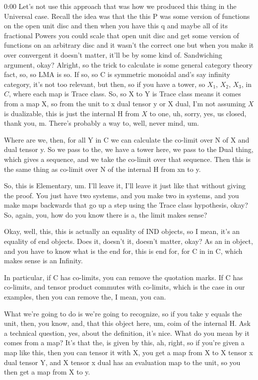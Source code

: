 \begin{unfinished}{0:00}
Let's not use this approach that was how we produced this thing in the Universal case. Recall the idea was that the this P was some version of functions on the open unit disc and then when you have this q and maybe all of its fractional Powers you could scale that open unit disc and get some version of functions on an arbitrary disc and it wasn't the correct one but when you make it over convergent it doesn't matter, it'll be by some kind of.
Sandwiching argument, okay? Alright, so the trick to calculate is some general category theory fact, so, so LMA is so. If so, so C is symmetric monoidal and's say infinity category, it's not too relevant, but then, so if you have a tower, so $X_1$, $X_2$, $X_3$, in $C$, where each map is Trace class. So, so X to Y is Trace class means it comes from a map X, so from the unit to x dual tensor y or X dual, I'm not assuming $X$ is dualizable, this is just the internal H from $X$ to one, uh, sorry, yes, us closed, thank you, m. There's probably a way to, well, never mind, um.

Where are we, then, for all Y in C we can calculate the co-limit over N of X and dual tensor y. So we pass to the, we have a tower here, we pass to the Dual thing, which gives a sequence, and we take the co-limit over that sequence. Then this is the same thing as co-limit over N of the internal H from xn to y.

So, this is Elementary, um. I'll leave it, I'll leave it just like that without giving the proof. You just have two systems, and you make two in systems, and you make maps backwards that go up a step using the Trace class hypothesis, okay? So, again, you, how do you know there is a, the limit makes sense?

Okay, well, this, this is actually an equality of IND objects, so I mean, it's an equality of end objects. Does it, doesn't it, doesn't matter, okay? As an in object, and you have to know what is the end for, this is end for, for C in in C, which makes sense is an Infinity.

In particular, if C has co-limits, you can remove the quotation marks. If C has co-limits, and tensor product commutes with co-limits, which is the case in our examples, then you can remove the, I mean, you can.

What we're going to do is we're going to recognize, so if you take y equals the unit, then, you know, and, that this object here, um, coim of the internal H. Ask a technical question, yes, about the definition, it's nice. What do you mean by it comes from a map? It's that the, is given by this, ah, right, so if you're given a map like this, then you can tensor it with X, you get a map from X to X tensor x dual tensor Y, and X tensor x dual has an evaluation map to the unit, so you then get a map from X to y.


\end{unfinished}
